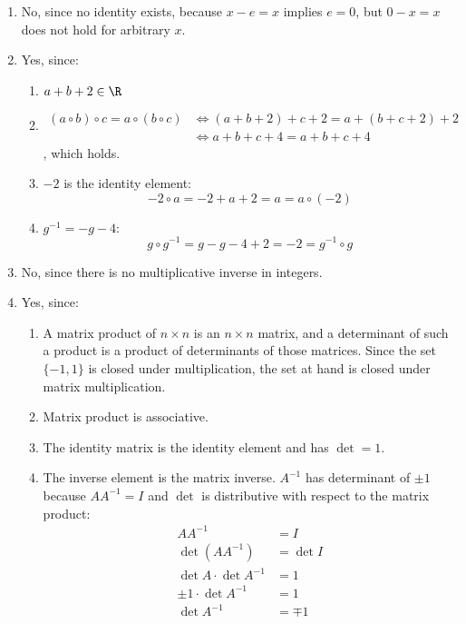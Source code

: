 \begin{solution}\itemfix
    \begin{enumerate}
        \item No, since no identity exists, because \(x - e = x\) implies \(e = 0\), but \(0 - x = x\) does not hold for arbitrary \(x\).
        \item Yes, since:
              \begin{enumerate}
                  \item \(a + b + 2 \in \R\)
                  \item \begin{align*}
                            (a \circ b) \circ c = a \circ (b \circ c) & \Leftrightarrow (a + b + 2) + c + 2 = a + (b + c + 2) + 2 \\
                                                                      & \Leftrightarrow a + b + c + 4 = a + b + c + 4
                        \end{align*}
                        , which holds.
                  \item \( - 2\) is the identity element:
                        \[ - 2 \circ a = - 2 + a + 2 = a = a \circ (- 2)\]
                  \item \(g^{ - 1} = - g - 4\):
                        \[g \circ g^{ - 1} = g - g - 4 + 2 = - 2 = g^{ - 1} \circ g\]
              \end{enumerate}
        \item No, since there is no multiplicative inverse in integers.
        \item Yes, since:
              \begin{enumerate}
                  \item A matrix product of \(n \times n\) is an \(n \times n\) matrix, and a determinant of such a product is a product of determinants of those matrices. Since the set \(\{ - 1, 1\}\) is closed under multiplication, the set at hand is closed under matrix multiplication.
                  \item Matrix product is associative.
                  \item The identity matrix is the identity element and has \(\det = 1\).
                  \item The inverse element is the matrix inverse. \(A^{ - 1}\) has determinant of \( \pm 1\) because \(A A^{ - 1} = I\) and \(\det\) is distributive with respect to the matrix product:
                        \begin{align*}
                            A A^{ - 1}                 & = I      \\
                            \det(A A^{ - 1})           & = \det I \\
                            \det A \cdot \det A^{ - 1} & = 1      \\
                            \pm 1 \cdot \det A^{ - 1}  & = 1      \\
                            \det A^{ - 1}              & = \mp 1
                        \end{align*}
              \end{enumerate}
    \end{enumerate}
\end{solution}

